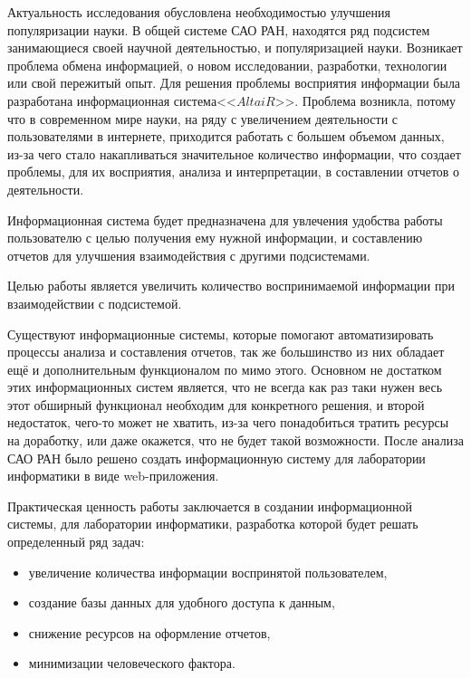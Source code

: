 Актуальность исследования обусловлена необходимостью улучшения популяризации науки. В общей системе САО РАН, находятся ряд подсистем занимающиеся своей научной деятельностью, и популяризацией науки. Возникает проблема обмена информацией, о новом исследовании, разработки, технологии или свой пережитый опыт. Для решения проблемы восприятия информации была разработана информационная система<<$AltaiR$>>. Проблема возникла, потому что в современном мире науки, на ряду с увеличением деятельности с пользователями в интернете, приходится работать с большем объемом данных, из-за чего стало накапливаться значительное количество информации, что создает проблемы, для их восприятия, анализа и интерпретации, в составлении отчетов о деятельности. 

Информационная система будет предназначена для увлечения удобства работы пользователю с целью получения ему нужной информации, и составлению отчетов для улучшения взаимодействия с другими подсистемами.

Целью работы является увеличить количество воспринимаемой информации при взаимодействии с подсистемой. 

Существуют информационные системы, которые помогают автоматизировать процессы анализа и составления отчетов, так же большинство из них обладает ещё и дополнительным функционалом по мимо этого. Основном не достатком этих информационных систем является, что не всегда как раз таки нужен весь этот обширный функционал необходим для конкретного решения, и второй недостаток, чего-то может не хватить, из-за чего понадобиться тратить ресурсы на доработку, или даже окажется, что не будет такой возможности. После анализа САО РАН было решено создать информационную систему для лаборатории информатики в виде web-приложения.

Практическая ценность работы заключается в создании информационной системы, для лаборатории информатики, разработка которой будет решать определенный ряд задач:
\begin{itemize}
	\item увеличение количества информации воспринятой пользователем,
	\item создание базы данных для удобного доступа к данным,
	\item снижение ресурсов на оформление отчетов,
	\item минимизации человеческого фактора.
\end{itemize}


